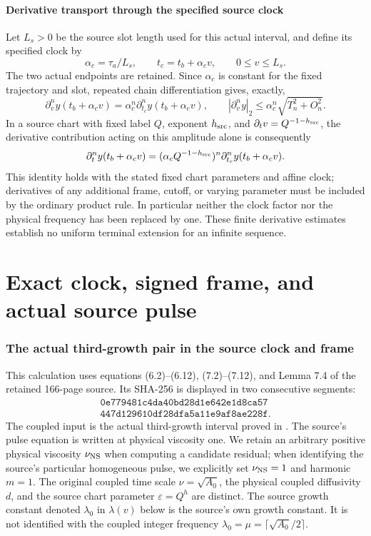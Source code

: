 \documentclass[11pt]{article}
\begin{document}
\subsection{Derivative transport through the specified source clock}

Let $L_s>0$ be the source slot length used for this actual interval,
and define its specified clock by
\[
 \alpha_c=\tau_a/L_s,\qquad
 t_c=t_b+\alpha_c v,\qquad 0\leq v\leq L_s.
\]
The two actual endpoints are retained. Since $\alpha_c$ is constant
for the fixed trajectory and slot, repeated chain differentiation
gives, exactly,
\begin{equation}\label{tgdc:clock}
 \partial_v^ny(t_b+\alpha_cv)
      =\alpha_c^n\partial_{t_c}^ny(t_b+\alpha_cv),\qquad
 |\partial_v^ny|_2\leq\alpha_c^n\sqrt{T_n^2+O_n^2}.
\end{equation}
In a source chart with fixed label $Q$, exponent $h_{\rm src}$,
and $\partial_t v=Q^{-1-h_{\rm src}}$, the derivative contribution
acting on this amplitude alone is consequently
\[
 \partial_t^ny(t_b+\alpha_cv)
  =(\alpha_cQ^{-1-h_{\rm src}})^n
                      \partial_{t_c}^ny(t_b+\alpha_cv).
\]
This identity holds with the stated fixed chart parameters and affine
clock; derivatives of any additional frame, cutoff, or varying
parameter must be included by the ordinary product rule. In particular
neither the clock factor nor the physical frequency has been replaced
by one. These finite derivative estimates establish no uniform
terminal extension for an infinite sequence.

\clearpage\part{Exact clock, signed frame, and actual source pulse}
\section{The actual third-growth pair in the source clock and frame}
\label{tgframe:section}

This calculation uses equations (6.2)--(6.12), (7.2)--(7.12), and
Lemma 7.4 of the retained 166-page source. Its SHA-256 is displayed
in two consecutive segments:
\[
\begin{gathered}
\texttt{0e779481c4da40bd28d1e642e1d8ca57}\\
\texttt{447d129610df28dfa5a11e9af8ae228f}.
\end{gathered}
\]
The coupled input is the actual third-growth interval proved in
. The source's pulse
equation is written at physical viscosity one. We retain an arbitrary
positive physical viscosity $\nu_{\rm NS}$ when computing a candidate
residual; when identifying the source's particular homogeneous pulse,
we explicitly set $\nu_{\rm NS}=1$ and harmonic $m=1$.
The original coupled time scale $\nu=\sqrt{A_0}$, the physical coupled
diffusivity $d$, and the source chart parameter $\varepsilon=Q^h$
are distinct.
The source growth constant denoted $\lambda_0$ in $\lambda(v)$ below
is the source's own growth constant. It is not identified with the
coupled integer frequency $\lambda_0=\mu=\lceil\sqrt{A_0}/2\rceil$.
\end{document}
